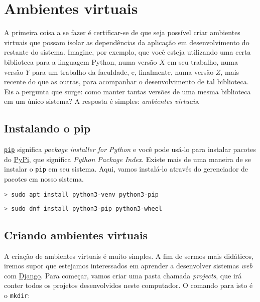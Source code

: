 \section{Ambientes virtuais}\label{sec:ambientes-virtuais}

A primeira coisa a se fazer é certificar-se de que seja possível criar ambientes
virtuais que possam isolar as dependências da aplicação em desenvolvimento do
restante do sistema. Imagine, por exemplo, que você esteja utilizando uma certa
biblioteca para a linguagem Python, numa versão \(X\) em seu trabalho, numa
versão \(Y\) para um trabalho da faculdade, e, finalmente, numa versão \(Z\),
mais recente do que as outras, para acompanhar o desenvolvimento de tal
biblioteca. Eis a pergunta que surge: como manter tantas versões de uma mesma
biblioteca em um único sistema? A resposta é simples: \textit{ambientes
virtuais}.

\subsection{Instalando o pip}\label{ssec:instalando-o-pip}

\href{https://pypi.org/project/pip/}{\texttt{pip}} significa \textit{package
installer for Python} e você pode usá-lo para instalar pacotes do
\href{https://pypi.org/}{PyPi}, que significa \textit{Python Package Index}.
Existe mais de uma maneira de se instalar o \texttt{pip} em seu sistema. Aqui,
vamos instalá-lo através do gerenciador de pacotes em nosso sistema.

\begin{lstlisting}[language=bash,caption={Instalando o \texttt{pip} no Debian}]
  > sudo apt install python3-venv python3-pip
\end{lstlisting}

\begin{lstlisting}[language=bash,caption={Instalando o \texttt{pip} no Fedora}]
  > sudo dnf install python3-pip python3-wheel
\end{lstlisting}

\subsection{Criando ambientes virtuais}\label{ssec:criando-ambientes-virtuais}

A criação de ambientes virtuais é muito simples. A fim de sermos mais didáticos,
iremos supor que estejamos interessados em aprender a desenvolver sistemas
\textit{web} com \href{https://www.djangoproject.com/}{Django}. Para começar,
vamos criar uma pasta chamada \textit{projects}, que irá conter todos os
projetos desenvolvidos neste computador. O comando para isto é o \texttt{mkdir}:

